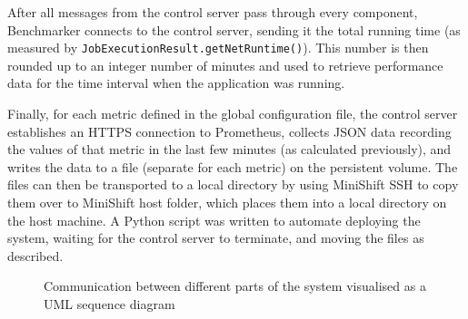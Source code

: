 \documentclass{article}
\begin{document}
After all messages from the control server pass through every component,
Benchmarker connects to the control server, sending it the total running time
(as measured by \texttt{JobExecutionResult.getNetRuntime()}). This number is
then rounded up to an integer number of minutes and used to retrieve performance
data for the time interval when the application was running.

Finally, for each metric defined in the global configuration file, the control
server establishes an HTTPS connection to Prometheus, collects JSON data
recording the values of that metric in the last few minutes (as calculated
previously), and writes the data to a file (separate for each metric) on the
persistent volume. The files can then be transported to a local directory by
using MiniShift SSH to copy them over to MiniShift host folder, which places
them into a local directory on the host machine. A Python script was written to
automate deploying the system, waiting for the control server to terminate, and
moving the files as described.

\begin{figure}
  \centering
  \caption{Communication between different parts of the system visualised as a
    UML sequence diagram}
  \label{fig:communication}
\end{figure}
\end{document}
